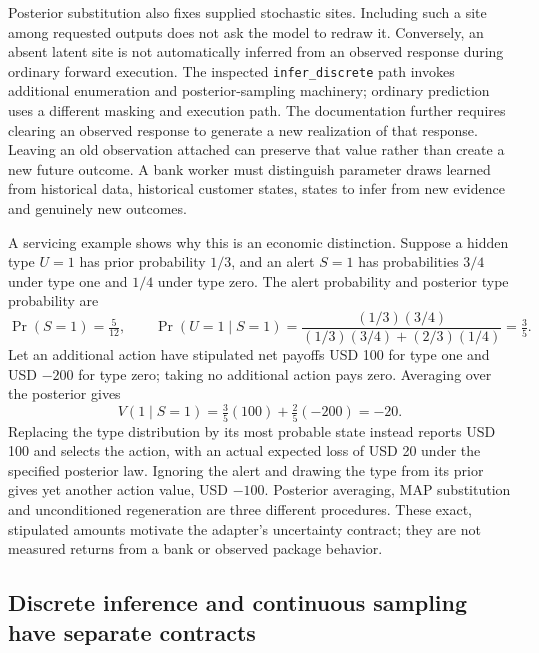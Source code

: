 Posterior substitution also fixes supplied stochastic sites. Including such a site among requested outputs does not ask the model to redraw it. Conversely, an absent latent site is not automatically inferred from an observed response during ordinary forward execution. The inspected \texttt{infer\_discrete} path invokes additional enumeration and posterior-sampling machinery; ordinary prediction uses a different masking and execution path. The documentation further requires clearing an observed response to generate a new realization of that response. Leaving an old observation attached can preserve that value rather than create a new future outcome. A bank worker must distinguish parameter draws learned from historical data, historical customer states, states to infer from new evidence and genuinely new outcomes. \citep{exec23_numpyro_sources}

A servicing example shows why this is an economic distinction. Suppose a hidden type $U=1$ has prior probability $1/3$, and an alert $S=1$ has probabilities $3/4$ under type one and $1/4$ under type zero. The alert probability and posterior type probability are
\begin{equation}
 \Pr(S=1)=\tfrac{5}{12},\qquad
 \Pr(U=1\mid S=1)=
 \frac{(1/3)(3/4)}{(1/3)(3/4)+(2/3)(1/4)}=\tfrac35.
\end{equation}
Let an additional action have stipulated net payoffs USD 100 for type one and USD $-200$ for type zero; taking no additional action pays zero. Averaging over the posterior gives
\begin{equation}
 V(1\mid S=1)=\tfrac35(100)+\tfrac25(-200)=-20.
\end{equation}
Replacing the type distribution by its most probable state instead reports USD 100 and selects the action, with an actual expected loss of USD 20 under the specified posterior law. Ignoring the alert and drawing the type from its prior gives yet another action value, USD $-100$. Posterior averaging, MAP substitution and unconditioned regeneration are three different procedures. These exact, stipulated amounts motivate the adapter's uncertainty contract; they are not measured returns from a bank or observed package behavior. \citep{exec23_numpyro_reference}

\subsection{Discrete inference and continuous sampling have separate contracts}

